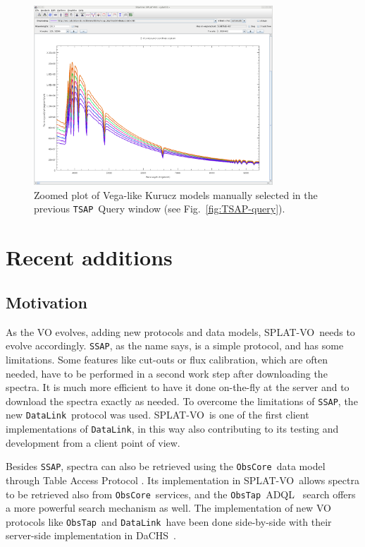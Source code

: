 \documentclass[final,authoryear,5p,times,twocolumn]{elsarticle}
\newcommand{\datalink}{\texttt{DataLink}}
\newcommand{\ssap}{\texttt{SSAP}}
\newcommand{\tsap}{\texttt{TSAP}}
\newcommand{\obstap}{\texttt{ObsTap}}
\newcommand{\obscore}{\texttt{ObsCore}}
\newcommand{\adql}{ADQL}
\newcommand{\splatvo}{{\textsf{\small{SPLAT-VO}}}}
\newcommand{\dachs}{\textsf{\small DaCHS}}
\begin{document}
\begin{figure}[t]
\begin{center}
\includegraphics[width=0.8\textwidth]{TSSA-plot.pdf}
\caption{Zoomed plot of Vega-like Kurucz models manually selected in the previous
\tsap\ Query window (see Fig.~\ref{fig:TSAP-query}). }
\label{fig:TSAP-plot}
\end{center}
\end{figure}



\section{Recent additions}


\subsection{Motivation}

As the VO evolves, adding new protocols and data models, \splatvo\ needs to
evolve accordingly.  \ssap, as the name says, is a simple protocol, and has
some limitations. Some features like cut-outs or flux calibration, which are
often needed, have to be performed in a second work step after downloading the
spectra. It is much more efficient to have it done on-the-fly at the server
and  to download the spectra exactly as needed. To overcome the limitations of
\ssap, the new \datalink\ protocol \citep{datalink} was used. \splatvo\
is one of the first client implementations of \datalink, in this way
also contributing to its testing and development from a client point of view.

Besides \ssap, spectra can also be retrieved using the \obscore\ data model
through Table Access Protocol  \citep[known as \obstap;][]{obstap}. Its implementation in
\splatvo\ allows spectra to be retrieved also from \obscore\ services, and
the \obstap\ \adql\ \citep{adql} search offers a more powerful search
mechanism as well. The implementation of new VO protocols like \obstap\
and \datalink\ have been done side-by-side with their server-side
implementation in \dachs\ \citep[Data Center Helper Suite;][]{dachs}.
\end{document}

